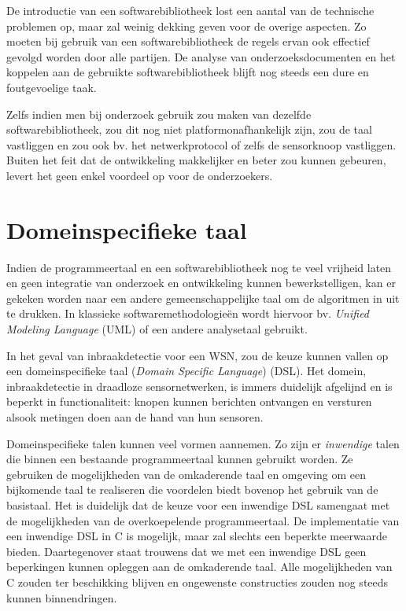 De introductie van een softwarebibliotheek lost een aantal van de technische
problemen op, maar zal weinig dekking geven voor de overige aspecten. Zo moeten
bij gebruik van een softwarebibliotheek de regels ervan ook effectief gevolgd
worden door alle partijen. De analyse van onderzoeksdocumenten en het koppelen
aan de gebruikte softwarebibliotheek blijft nog steeds een dure en
foutgevoelige taak.

Zelfs indien men bij onderzoek gebruik zou maken van dezelfde
softwarebibliotheek, zou dit nog niet platformonafhankelijk zijn, zou de taal
vastliggen en zou ook bv. het netwerkprotocol of zelfs de sensorknoop
vastliggen. Buiten het feit dat de ontwikkeling makkelijker en beter zou kunnen
gebeuren, levert het geen enkel voordeel op voor de onderzoekers.

\vspace{-3mm}

\section{Domeinspecifieke taal}
\label{section:solution-dsl}

Indien de programmeertaal en een softwarebibliotheek nog te veel vrijheid laten
en geen integratie van onderzoek en ontwikkeling kunnen bewerkstelligen, kan er
gekeken worden naar een andere gemeenschappelijke taal om de algoritmen in uit
te drukken. In klassieke softwaremethodologie\"en wordt hiervoor bv.
\emph{Unified Modeling Language} (UML) \citep{url:uml} of een andere
analysetaal gebruikt.

In het geval van inbraakdetectie voor een WSN, zou de keuze kunnen vallen op
een domeinspecifieke taal (\emph{Domain Specific Language})
(DSL)\citep{van2000domain, mernik2005and, fowler2010domain}. Het domein,
inbraakdetectie in draadloze sensornetwerken, is immers duidelijk afgelijnd en
is beperkt in functionaliteit: knopen kunnen berichten ontvangen en versturen
alsook metingen doen aan de hand van hun sensoren.

Domeinspecifieke talen kunnen veel vormen aannemen. Zo zijn er \emph{inwendige}
talen die binnen een bestaande programmeertaal kunnen gebruikt worden. Ze
gebruiken de mogelijkheden van de omkaderende taal en omgeving om een
bijkomende taal te realiseren die voordelen biedt bovenop het gebruik van de
basistaal. Het is duidelijk dat de keuze voor een inwendige DSL samengaat met
de mogelijkheden van de overkoepelende programmeertaal. De implementatie van
een inwendige DSL in C is mogelijk, maar zal slechts een beperkte meerwaarde
bieden. Daartegenover staat trouwens dat we met een inwendige DSL geen
beperkingen kunnen opleggen aan de omkaderende taal. Alle mogelijkheden van C
zouden ter beschikking blijven en ongewenste constructies zouden nog steeds
kunnen binnendringen.

